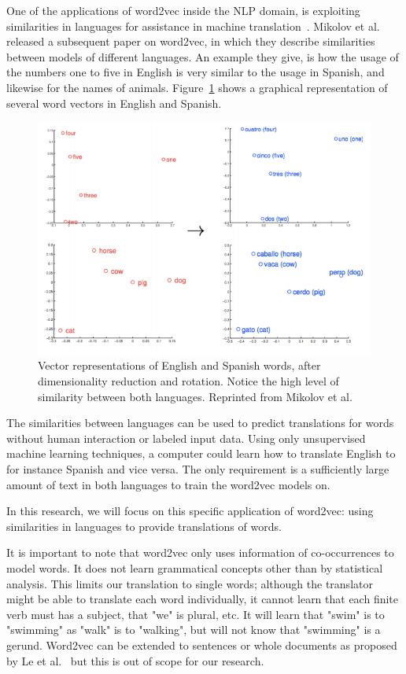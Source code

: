 One of the applications of word2vec inside the NLP domain, is exploiting similarities in languages for assistance in machine translation~\cite{wolf2014joint}. Mikolov et al.~\cite{mikolov2013exploiting} released a subsequent paper on word2vec, in which they describe similarities between models of different languages. An example they give, is how the usage of the numbers one to five in English is very similar to the usage in Spanish, and likewise for the names of animals. Figure~\ref{fig:english_spanish} shows a graphical representation of several word vectors in English and Spanish.

\begin{figure}[ht!]
  \centering \includegraphics[width=\linewidth]{images/english_spanish}
  \caption{Vector representations of English and Spanish words, after dimensionality reduction and rotation. Notice the high level of similarity between both languages. Reprinted from Mikolov et al.~\cite{mikolov2013exploiting}}
  \label{fig:english_spanish}
\end{figure}

The similarities between languages can be used to predict translations for words without human interaction or labeled input data. Using only unsupervised machine learning techniques, a computer could learn how to translate English to for instance Spanish and vice versa. The only requirement is a sufficiently large amount of text in both languages to train the word2vec models on.

In this research, we will focus on this specific application of word2vec: using similarities in languages to provide translations of words.

It is important to note that word2vec only uses information of co-occurrences to model words. It does not learn grammatical concepts other than by statistical analysis. This limits our translation to single words; although the translator might be able to translate each word individually, it cannot learn that each finite verb must has a subject, that "we" is plural, etc. It will learn that "swim" is to "swimming" as "walk" is to "walking", but will not know that "swimming" is a gerund. Word2vec can be extended to sentences or whole documents as proposed by Le et al.~\cite{le2014distributed} but this is out of scope for our research.

